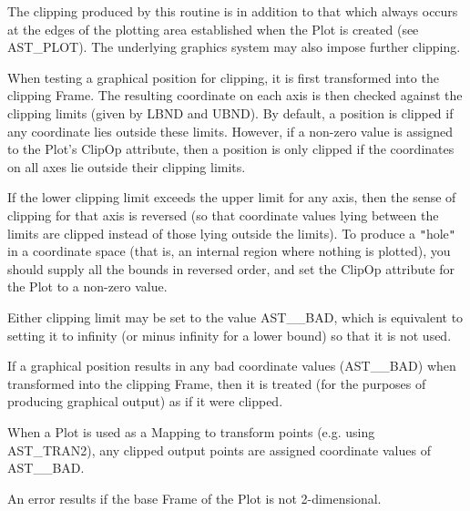 \documentclass[twoside,11pt]{article}
\newcommand{\htmlref}[2]{#1}
\begin{document}
{{{         \sstitem
         The clipping produced by this routine is in addition to that
         which always occurs at the edges of the plotting area
         established when the Plot is created (see \htmlref{AST\_PLOT}{AST_PLOT}). The
         underlying graphics system may also impose further clipping.

         \sstitem
         When testing a graphical position for clipping, it is first
         transformed into the clipping Frame. The resulting coordinate on
         each axis is then checked against the clipping limits (given by
         LBND and UBND). By default, a position is clipped if any
         coordinate lies outside these limits. However, if a non-zero
         value is assigned to the Plot's \htmlref{ClipOp}{ClipOp} attribute, then a
         position is only clipped if the coordinates on all axes lie
         outside their clipping limits.

         \sstitem
         If the lower clipping limit exceeds the upper limit for any
         axis, then the sense of clipping for that axis is reversed (so
         that coordinate values lying between the limits are clipped
         instead of those lying outside the limits). To produce a {\tt{"}}hole{\tt{"}}
         in a coordinate space (that is, an internal region where nothing
         is plotted), you should supply all the bounds in reversed order,
         and set the ClipOp attribute for the Plot to a non-zero value.

         \sstitem
         Either clipping limit may be set to the value AST\_\_BAD, which
         is equivalent to setting it to infinity (or minus infinity for a
         lower bound) so that it is not used.

         \sstitem
         If a graphical position results in any bad coordinate values
         (AST\_\_BAD) when transformed into the clipping Frame, then it is
         treated (for the purposes of producing graphical output) as if
         it were clipped.

         \sstitem
         When a Plot is used as a \htmlref{Mapping}{Mapping} to transform points
         (e.g. using \htmlref{AST\_TRAN2}{AST_TRAN2}), any clipped output points are assigned
         coordinate values of AST\_\_BAD.

         \sstitem
         An error results if the base Frame of the Plot is not
         2-dimensional.
      }
   }
}
\end{document}
